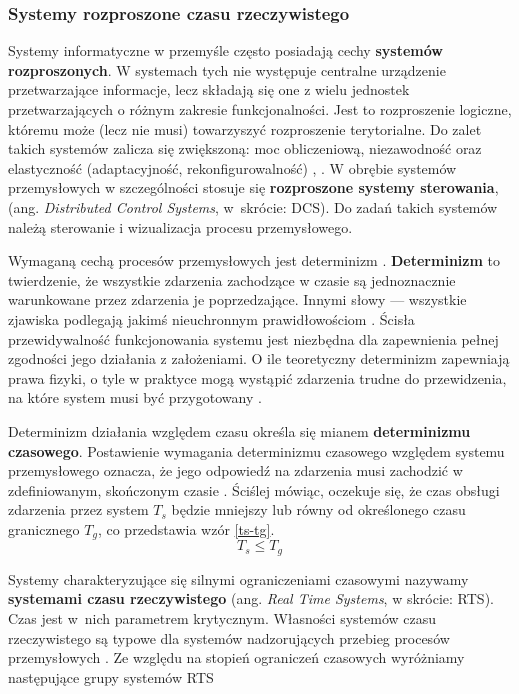 \documentclass[a4paper, 12pt, twoside]{article}
\begin{document}
\subsubsection{Systemy rozproszone czasu rzeczywistego}

Systemy informatyczne w przemyśle często posiadają cechy \textbf{systemów rozproszonych}.
W systemach tych nie występuje centralne urządzenie
przetwarzające informacje, lecz składają się one z wielu jednostek
przetwarzających o różnym zakresie funkcjonalności. Jest to rozproszenie logiczne,
któremu może (lecz nie musi) towarzyszyć rozproszenie terytorialne. Do zalet
takich systemów zalicza się zwiększoną: moc obliczeniową, niezawodność oraz 
elastyczność (adaptacyjność, rekonfigurowalność)
\cite{isp},
\cite{isp-analiza-przepływu-informacji}. W obrębie systemów przemysłowych
w szczególności stosuje się \textbf{rozproszone systemy sterowania}, 
(ang. \emph{Distributed Control Systems}, w~skrócie: DCS). Do zadań takich systemów
należą sterowanie i wizualizacja procesu przemysłowego. 

Wymaganą cechą procesów przemysłowych jest determinizm \cite{isp}. \textbf{Determinizm}
to twierdzenie, że wszystkie zdarzenia zachodzące w czasie są jednoznacznie
warunkowane przez zdarzenia je poprzedzające. Innymi słowy --- wszystkie zjawiska
podlegają jakimś nieuchronnym prawidłowościom \cite{determinizm}. Ścisła przewidywalność
funkcjonowania systemu jest niezbędna dla zapewnienia pełnej zgodności 
jego działania z założeniami. O ile teoretyczny determinizm zapewniają prawa fizyki,
o tyle w praktyce mogą wystąpić zdarzenia trudne do przewidzenia, na które
system musi być przygotowany \cite{isp}.

Determinizm działania względem czasu określa się mianem \textbf{determinizmu czasowego}.
Postawienie wymagania determinizmu czasowego względem systemu przemysłowego oznacza,
że jego odpowiedź na zdarzenia musi zachodzić w zdefiniowanym, skończonym czasie
\cite{isp}.
Ściślej mówiąc, oczekuje się, że czas obsługi zdarzenia przez system $T_s$ będzie
mniejszy lub równy od określonego czasu granicznego $T_g$, co przedstawia 
wzór \ref{ts-tg}.
\begin{equation}
    T_s \leq T_g\label{ts-tg}
\end{equation}

Systemy charakteryzujące się silnymi ograniczeniami czasowymi nazywamy 
\textbf{systemami czasu rzeczywistego} (ang. \emph{Real Time Systems}, w skrócie: RTS). 
Czas jest w~nich parametrem krytycznym. 
Własności systemów czasu rzeczywistego są typowe dla systemów
nadzorujących przebieg procesów przemysłowych \cite{isp-analiza-przepływu-informacji}.
Ze względu na stopień ograniczeń czasowych wyróżniamy następujące grupy systemów RTS 
\end{document}
